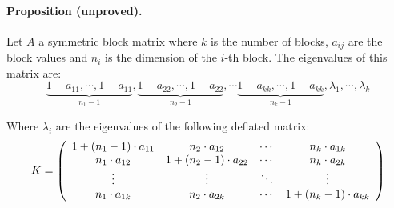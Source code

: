 \documentclass[a4paper,12pt,final]{article}
\begin{document}
\paragraph{Proposition (unproved).} Let $A$ a symmetric block matrix where 
$k$ is the number of blocks, $a_{ij}$ are the block values and $n_i$ is 
the dimension of the $i$-th block. The eigenvalues of this matrix are:
\begin{displaymath}
\underbrace{1-a_{11}, \cdots, 1-a_{11}}_{n_1-1},
\underbrace{1-a_{22}, \cdots, 1-a_{22}}_{n_2-1},  
\cdots
\underbrace{1-a_{kk}, \cdots, 1-a_{kk}}_{n_k-1},  
\lambda_1, \cdots, \lambda_k
\end{displaymath}

Where $\lambda_i$ are the eigenvalues of the following deflated matrix:
\begin{displaymath}
K = \left(
\begin{array}{cccc}
1+(n_1-1) \cdot a_{11} & n_2 \cdot a_{12}       & \cdots & n_k \cdot a_{1k}       \cr
      n_1 \cdot a_{12} & 1+(n_2-1) \cdot a_{22} & \cdots & n_k \cdot a_{2k}       \cr
\vdots                 & \vdots                 & \ddots & \vdots                 \cr
n_1 \cdot a_{1k}       & n_2 \cdot a_{2k}       & \cdots & 1+(n_k-1) \cdot a_{kk} \cr
\end{array}
\right)
\end{displaymath}


\newpage


\end{document}
